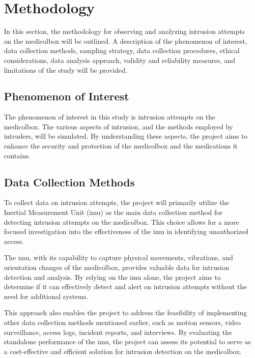 \documentclass[../main.tex]{subfiles}
\begin{document}
    \section{Methodology}
    In this section, the methodology for observing and
    analyzing \gls{intrusion} attempts on the
    \gls{medicolbox} will be outlined.
    A description of the phenomenon of interest,
    data collection methods, sampling strategy,
    data collection procedures, ethical considerations,
    data analysis approach, validity and reliability measures,
    and limitations of the study will be provided.

    \subsection{Phenomenon of Interest}
    The phenomenon of interest in this study is
    \gls{intrusion} attempts on the \gls{medicolbox}.
    The various aspects of \gls{intrusion},
    and the methods employed by intruders,
    will be simulated. By understanding these aspects,
    the project aims to enhance the
    security and protection of the
    \gls{medicolbox} and the medications it contains.

    \subsection{Data Collection Methods}
    To collect data on \gls{intrusion} attempts,
    the project will primarily utilize the
    Inertial Measurement Unit (\gls{imu}) as the
    main data collection method for detecting
    \gls{intrusion} attempts on the \gls{medicolbox}.
    This choice allows for a more focused investigation into the
    effectiveness of the \gls{imu} in identifying unauthorized access.

    The \gls{imu}, with its capability to capture physical movements,
    vibrations, and orientation changes of the \gls{medicolbox},
    provides valuable data for \gls{intrusion} detection and analysis.
    By relying on the \gls{imu} alone,
    the project aims to determine if it can effectively detect and
    alert on \gls{intrusion} attempts without the
    need for additional systems.

    This approach also enables the project to address the
    feasibility of implementing other
    data collection methods mentioned earlier,
    such as motion sensors, video surveillance,
    access logs, incident reports, and interviews.
    By evaluating the standalone performance of the \gls{imu},
    the project can assess its potential to serve as a cost-effective and
    efficient solution for \gls{intrusion} detection on the \gls{medicolbox}.
\end{document}
